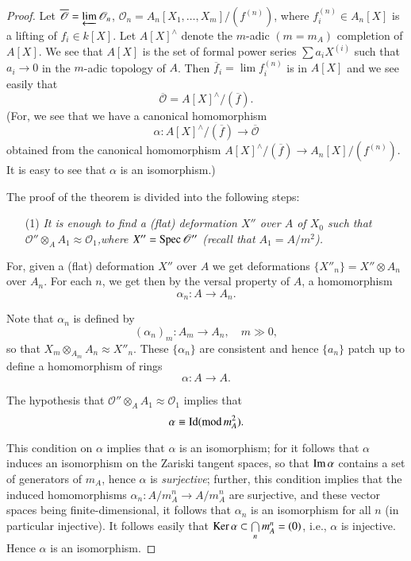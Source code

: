 \begin{proof}
Let $\overline{\mathscr{O}}=\varprojlim \mathscr{O}_{n}$,
$\mathscr{O}_{n}=A_{n}[X_{1},\ldots,X_{m}]/(f^{(n)})$, where
$f^{(n)}_{i}\in A_{n}[X]$ is a lifting of $f_{i}\in k[X]$. Let
$A[X]^{\wedge}$ denote the $m$-adic $(m=m_{A})$ completion of $A[X]$. We
see that $A[X]$ is the set of formal power series $\sum a_{i}X^{(i)}$
such that $a_{i}\to 0$ in the $m$-adic topology of $A$. Then
$\overline{f}_{i}=\lim f^{(n)}_{i}$ is in $A[X]$ and we see easily
that
$$
\overline{\mathscr{O}}=A[X]^{\wedge}/(\overline{f}).
$$
(For, we see that we have a canonical homomorphism
$$
\alpha:A[X]^{\wedge}/(\overline{f})\to \overline{\mathscr{O}}
$$
obtained from the canonical homomorphism $A[X]^{\wedge}/(\overline{f})\to
A_{n}[X]/(f^{(n)})$. It is easy to see that $\alpha$ is an isomorphism.)

The proof of the theorem is divided into the following steps:
\begin{itemize}
\item[(1)] {\em It is enough to find a (flat) deformation $X''$ over
  $A$ of $X_{0}$ such that $\mathscr{O}''\otimes_{A}A_{1}\approx
  \mathscr{O}_{1}$,\pageoriginale where $X''=\operatorname{Spec} \mathscr{O}''$
  (recall that $A_{1}=A/m^{2}$).} 
\end{itemize}

For, given a (flat) deformation $X''$ over $A$ we get deformations\break
$\{X''_{n}\}=X''\otimes A_{n}$ over $A_{n}$. For each $n$, we get then
by the versal property of $A$, a homomorphism
$$
\alpha_{n}:A\to A_{n}.
$$

Note that $\alpha_{n}$ is defined by
$$
(\alpha_{n})_{m}:A_{m}\to A_{n},\quad m\gg 0,
$$
so that $X_{m}\otimes_{A_{m}}A_{n}\approx X''_{n}$. These
$\{\alpha_{n}\}$ are consistent and hence $\{a_{n}\}$ patch up to
define a homomorphism of rings
$$
\alpha:A\to A.
$$

The hypothesis that $\mathscr{O}''\otimes_{A}A_{1}\approx
\mathscr{O}_{1}$ implies that
$$
\alpha\equiv \text{Id}(\text{mod\,}m^{2}_{A}).
$$

This condition on $\alpha$ implies that $\alpha$ is an isomorphism;
for it follows that $\alpha$ induces an isomorphism on the Zariski
tangent spaces, so that $\operatorname{Im} \alpha$ contains a set of generators of
$m_{A}$, hence $\alpha$ is {\em surjective}; further, this condition
implies that the induced homomorphisms $\alpha_{n}:A/m^{n}_{A}\to
A/m^{n}_{A}$ are surjective, and these vector spaces being
finite-dimensional, it follows that $\alpha_{n}$ is an isomorphism for
all $n$ (in particular injective). It follows easily that $\operatorname{Ker}
\alpha\subset \bigcap\limits_{n}m^{n}_{A}=(0)$, i.e., $\alpha$ is
injective. Hence $\alpha$ is an isomorphism.


\end{proof}
